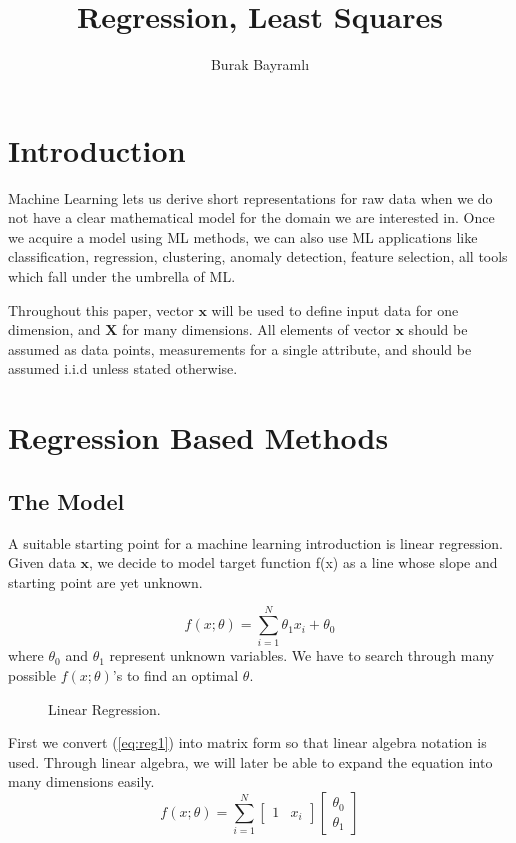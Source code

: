 \documentclass{ecctd01} %
\title{
Regression, Least Squares
}
\author{Burak Bayramlı}
\begin{document}
\maketitle

\section{Introduction}
Machine Learning lets us derive short representations for raw data
when we do not have a clear mathematical model for the domain we are
interested in. Once we  acquire a model using ML methods, we can also
use ML applications like classification, regression, clustering,
anomaly detection, feature selection, all tools which fall under
the umbrella of ML. 

Throughout this paper, vector $\mathbf{x}$ will be used to define
input data for one dimension, and $\mathbf{X}$ for many 
dimensions. All elements of vector $\mathbf{x}$ should be assumed
as data points, measurements for a single attribute, and should be
assumed i.i.d unless stated otherwise.

\section{Regression Based Methods}
\subsection{The Model}
A suitable starting point for a machine learning introduction is linear
regression. Given data $\mathbf{x}$, we decide to model target
function f(x) as a line whose slope and starting point are yet unknown. 

\begin{equation}
  \label{eq:reg1}
  f(x;\theta) = \sum_{i=1}^N \theta_{1}x_{i} + \theta_{0}
\end{equation}
where $\theta_{0}$ and $\theta_{1}$ represent unknown variables. We
have to search through many possible $f(x;\theta)$'s to find an 
optimal $\theta$. 

\begin{figure}[htpb]
  \vspace{3.0cm}  
  \caption{\label{linreg} Linear Regression.}
\end{figure}

First we convert (\ref{eq:reg1}) into matrix form so that linear
algebra notation is used. Through linear algebra, we will later be
able to expand the equation into many dimensions easily.
\begin{equation}
  \label{eq:reg2}
  f(x;\theta) = \sum_{i=1}^N 
  \left[ \begin{array}{cc}
      1 & x_{i}
  \end{array} \right]
  \left[ \begin{array}{c}
      \theta_{0} \\
      \theta_{1}
  \end{array} \right]
\end{equation}
\end{document}
